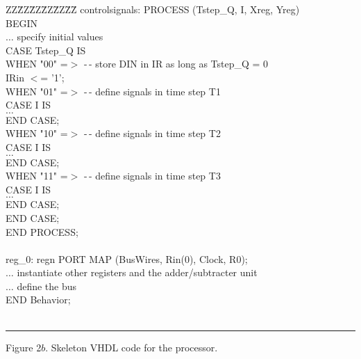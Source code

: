 \documentclass[epsfig,10pt,fullpage]{article}
\begin{document}
\begin{center}
\begin{minipage}[t]{12.5 cm}
\begin{tabbing}
ZZ\=ZZ\=ZZ\=ZZ\=ZZ\=ZZ\=\kill
\>controlsignals: PROCESS (Tstep\_Q, I, Xreg, Yreg)\\
\>BEGIN\\
\>\>$\ldots$ specify initial values\\
\>\>CASE Tstep\_Q IS\\
\>\>\>WHEN "00" =$>$ -\,- store DIN in IR as long as Tstep\_Q = 0\\
\>\>\>\>IRin $<$= '1';\\
\>\>\>WHEN "01" =$>$ -\,- define signals in time step T1\\
\>\>\>\>CASE I IS\\
\>\>\>\>\>$\ldots$ \\
\>\>\>\>END CASE;\\
\>\>\>WHEN "10" =$>$ -\,- define signals in time step T2\\
\>\>\>\>CASE I IS\\
\>\>\>\>\>$\ldots$ \\
\>\>\>\>END CASE;\\
\>\>\>WHEN "11" =$>$ -\,- define signals in time step T3\\
\>\>\>\>CASE I IS\\
\>\>\>\>\>$\ldots$ \\
\>\>\>\>END CASE;\\
\>\>END CASE;\\
\>END PROCESS;	\\
~\\
\>reg\_0: regn PORT MAP (BusWires, Rin(0), Clock, R0);\\
\>$\ldots$ instantiate other registers and the adder/subtracter unit\\
\>$\ldots$ define the bus\\
END Behavior;\\
~\rule{5.0in}{0in}
\end{tabbing}
\end{minipage}
\end{center}
\begin{center}
Figure 2$b$. Skeleton VHDL code for the processor.
\end{center}
\end{document}
